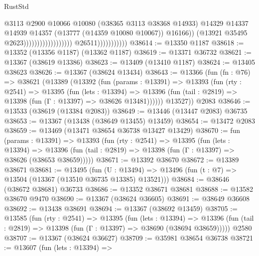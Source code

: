 \begin{lexlean}{RustStd}
\begin{coremodule}
                                                                @3113
                                                                @2900
                                                                @10066
                                                                @10080
                                                                (@38365 @3113 @38368 @14933)
                                                                @14329
                                                                @14337
                                                                @14939
                                                                @14357
                                                                (@13777 (@14359 @10080 @10067))
                                                                @16166))
                                                            (@13921 @35495 @2623))))))))))))))))))
                          @26511)))))))))))
@38614 := @13350 @1187
@38618 := @13352 (@13356 @1187) (@13362 @1187)
@38619 := @13371 @36732
@38621 := @13367 (@38619 @13386)
@38623 := @13409 (@13410 @1187)
@38624 := @13405 @38623
@38626 := @13367 (@38624 @13434)
@38643 := @13366
    (fun (fn : @76) =>
    @38621
      (@13389
        (@13392
          (fun (params : @13391) =>
          @13393
            (fun (rty : @2541) =>
            @13395
              (fun (lets : @13394) =>
              @13396 (fun (tail : @2819) => @13398 (fun (Γ : @13397) => @38626 @13481))))))
        @13527))
    @2083
@38646 := @13533 (@38619 (@13384 @2083))
@38649 := @13446 (@13447 @2083) @36735
@38653 := @13367 (@13438 (@38649 @13455) @13459)
@38654 := @13472 @2083
@38659 := @13469 (@13471 @38654 @36738 @13427 @13429)
@38670 := fun (params : @13391) =>
  @13393
    (fun (rty : @2541) =>
    @13395
      (fun (lets : @13394) =>
      @13396 (fun (tail : @2819) => @13398 (fun (Γ : @13397) => @38626 (@38653 @38659)))))
@38671 := @13392 @38670
@38672 := @13389 @38671
@38681 := @13495
    (fun (U : @13494) => @13496 (fun (t : @7) => @13504 (@13367 (@13510 @36735 @13385) @13521)))
@38684 := @38646 (@38672 @38681) @36733
@38686 := @13352 @38671 @38681
@38688 := @13582 @38670 @9470
@38690 := @13367 (@38624 @36605)
@38691 := @38649 @36608
@38692 := @13438 @38691
@38694 := @13367 (@38692 @13459)
@38705 := @13585
    (fun (rty : @2541) =>
    @13395
      (fun (lets : @13394) =>
      @13396 (fun (tail : @2819) => @13398 (fun (Γ : @13397) => @38690 (@38694 @38659)))))
    @2580
@38707 := @13367 (@38624 @36627)
@38709 := @35981 @38654 @36738
@38721 := @13607
    (fun (lets : @13394) =>

\end{coremodule}
\end{lexlean}
